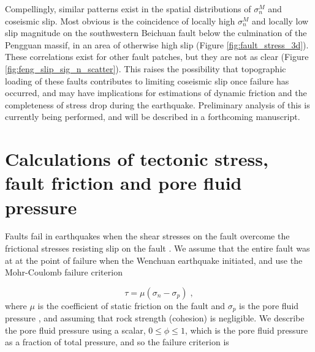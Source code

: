 \documentclass[draft,jgrga]{AGUTeX}
\begin{document}
\begin{article}
Compellingly, similar patterns exist in the spatial distributions of
$\sigma^M_n$ and coseismic slip. Most obvious is the coincidence of
locally high $\sigma^M_n$ and locally low slip magnitude on the
southwestern Beichuan fault below the culmination of the Pengguan
massif, in an area of otherwise high slip (Figure
\ref{fig:fault_stress_3d}). These correlations exist for other fault
patches, but they are not as clear (Figure
\ref{fig:feng_slip_sig_n_scatter}). This raises the possibility that
topographic loading of these faults contributes to limiting coseismic
slip once failure has occurred, and
may have implications for estimations of dynamic friction and the
completeness of stress drop during the earthquake. Preliminary analysis
of this is currently being performed, and will be described in a
forthcoming manuscript.


\section{Calculations of tectonic stress, fault friction and pore fluid
pressure}\label{calculations-of-tectonic-stress-fault-friction-and-pore-fluid-pressure}

Faults fail in earthquakes when the shear stresses on the fault overcome
the frictional stresses resisting slip on the fault \citep[e.g.,][]
{scholz2002}. We assume that the entire fault was at at the point of
failure when the Wenchuan earthquake initiated, and use the Mohr-Coulomb
failure criterion

\begin{equation} 
\tau = \mu ( \sigma_n - \sigma_p ) \; ,
\label{eqn:amonton_raw} 
\end{equation}
where $\mu$ is the coefficient of static friction on the fault and
$\sigma_p$ is the pore fluid pressure \citep[e.g.,][]{sibson1985}, and
assuming that rock strength (cohesion) is negligible. We
describe the pore fluid pressure using a scalar, $0 \leq \phi \leq 1$,
which is the pore fluid pressure as a fraction of total pressure, and so
the failure criterion is


\end{article}
\end{document}
